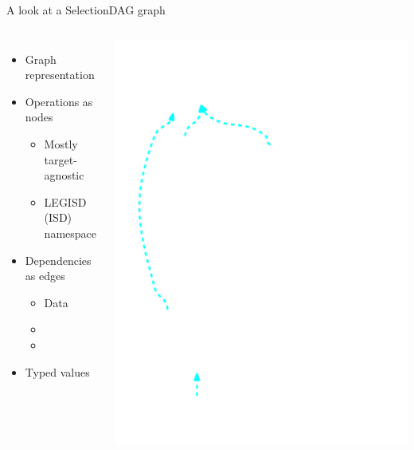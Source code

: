 \begin{frame}{A look at a SelectionDAG graph}

\begin{columns}[t]
    \begin{itemize}
        \item Graph representation
        \item Operations as nodes
        \begin{itemize}
            \item Mostly target-agnostic
            \item LEGISD (ISD) namespace
        \end{itemize}
        \item Dependencies as edges
        \begin{itemize}
            \item Data
            \item {}
            \item {}
        \end{itemize}
        \item Typed values
    \end{itemize}
    \begin{block}{}
        \vspace{-8ex}
        \includegraphics[width = 1.0\textwidth]{examples/ex1/ex1-entry-selection-dag.pdf}
    \end{block}
\end{columns}


\end{frame}
